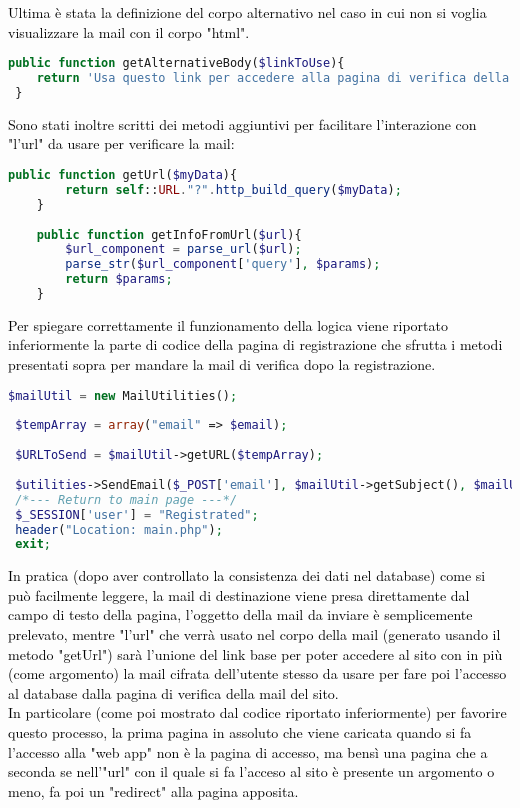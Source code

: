  \textcolor{black}{Ultima è stata la definizione del corpo alternativo nel caso in cui non si voglia visualizzare la mail con il corpo "html".}\\
 
  \begin{lstlisting}[language=php]
 public function getAlternativeBody($linkToUse){
 	return 'Usa questo link per accedere alla pagina di verifica della mail: '.$linkToUse;
 }
  \end{lstlisting}
  
  \textcolor{black}{Sono stati inoltre scritti dei metodi aggiuntivi per facilitare l'interazione con "l'url" da usare per verificare la mail:}\\
  
 \begin{lstlisting}[language=php]
   	public function getUrl($myData){
   		return self::URL."?".http_build_query($myData);
   	}
   	
   	public function getInfoFromUrl($url){
   		$url_component = parse_url($url);
   		parse_str($url_component['query'], $params);
   		return $params;
   	}
 \end{lstlisting}
 
 \textcolor{black}{Per spiegare correttamente il funzionamento della logica viene riportato inferiormente la parte di codice della pagina di registrazione che sfrutta i metodi presentati sopra per mandare la mail di verifica dopo la registrazione.}\\ 
 
 \begin{lstlisting}[language=php]
 $mailUtil = new MailUtilities();
 
 $tempArray = array("email" => $email);
 
 $URLToSend = $mailUtil->getURL($tempArray);
 
 $utilities->SendEmail($_POST['email'], $mailUtil->getSubject(), $mailUtil->getBody($URLToSend), $mailUtil->getAlternativeBody($URLToSend));
 /*--- Return to main page ---*/
 $_SESSION['user'] = "Registrated";
 header("Location: main.php");
 exit;
  \end{lstlisting}
  
 \textcolor{black}{ In pratica (dopo aver controllato la consistenza dei dati nel database) come si può facilmente leggere, la mail di destinazione viene presa direttamente dal campo di testo della pagina, l'oggetto della mail da inviare è semplicemente prelevato, mentre "l'url" che verrà usato nel corpo della mail (generato usando il metodo "getUrl") sarà l'unione del link base per poter accedere al sito con in più (come argomento) la mail cifrata dell'utente stesso da usare per fare poi l'accesso al database dalla pagina di verifica della mail del sito.\\
  In particolare (come poi mostrato dal codice riportato inferiormente) per favorire questo processo, la prima pagina in assoluto che viene caricata quando si fa l'accesso alla "web app" non è la pagina di accesso, ma bensì una pagina che a seconda se nell'"url" con il quale si fa l'acceso al sito è presente un argomento o meno, fa poi un "redirect" alla pagina apposita.}\\
  
